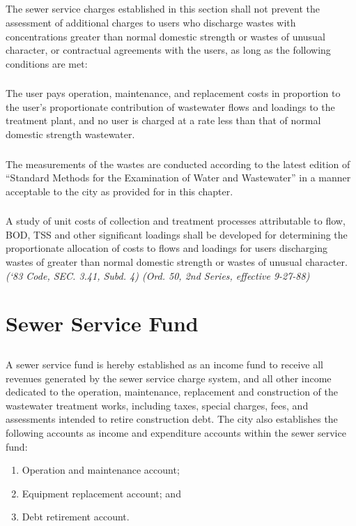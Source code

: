 \subsection{}
The sewer service charges established in this section shall not prevent the assessment of additional charges to users who discharge wastes with concentrations greater than normal domestic strength or wastes of unusual character, or contractual agreements with the users, as long as the following conditions are met:
\subsubsection{}
The user pays operation, maintenance, and replacement costs in proportion to the user’s proportionate contribution of wastewater flows and loadings to the treatment plant, and no user is charged at a rate less than that of normal domestic strength wastewater.
\subsubsection{}
The measurements of the wastes are conducted according to the latest edition of “Standard Methods for the Examination of Water and Wastewater” in a manner acceptable to the city as provided for in this chapter.
\subsubsection{}
A study of unit costs of collection and treatment processes attributable to flow, BOD, TSS and other significant loadings shall be developed for determining the proportionate allocation of costs to flows and loadings for users discharging wastes of greater than normal domestic strength or wastes of unusual character.\\
\emph{(‘83 Code, SEC. 3.41, Subd. 4) (Ord. 50, 2nd Series, effective 9-27-88)}
\section{Sewer Service Fund}
\subsection{}
A sewer service fund is hereby established as an income fund to receive all revenues generated by the sewer service charge system, and all other income dedicated to the operation, maintenance, replacement and construction of the wastewater treatment works, including taxes, special charges, fees, and assessments intended to retire construction debt.  The city also establishes the following accounts as income and expenditure accounts within the sewer service fund:
\begin{enumerate}
\item Operation and maintenance account;
\item Equipment replacement account; and
\item Debt retirement account.
\end{enumerate}

